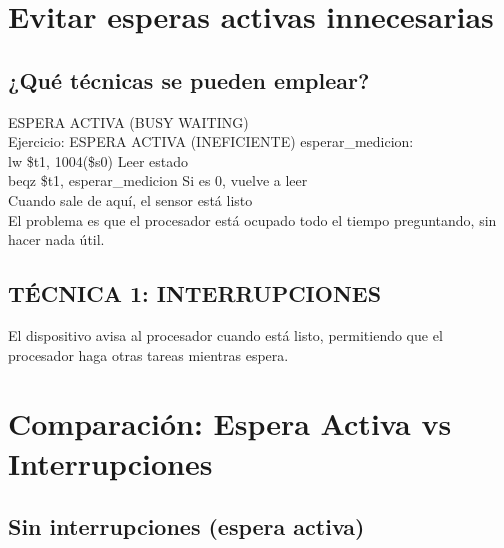 \documentclass{article}
\begin{document}
\section{Evitar esperas activas innecesarias}
\subsection{¿Qué técnicas se pueden emplear?}
ESPERA ACTIVA (BUSY WAITING)
\\
Ejercicio: ESPERA ACTIVA (INEFICIENTE)
esperar\_medicion:
\\
    lw \$t1, 1004(\$s0)      Leer estado
    \\
    beqz \$t1, esperar\_medicion   Si es 0, vuelve a leer
    \\
    Cuando sale de aquí, el sensor está listo
    \\

El problema es que el procesador está ocupado todo el tiempo preguntando, sin hacer nada útil.

\subsection{TÉCNICA 1: INTERRUPCIONES}
El dispositivo avisa al procesador cuando está listo, permitiendo que el procesador haga otras tareas mientras espera.
\section*{Comparación: Espera Activa vs Interrupciones}

\subsection*{Sin interrupciones (espera activa)}

\begin{center}
\end{center}
\end{document}

